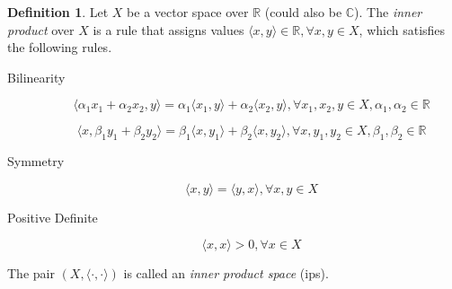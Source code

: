 \documentclass[11pt]{amsart}
\theoremstyle{definition}
\newtheorem{definition}[theorem]{Definition}
\numberwithin{equation}{section}
\newcommand{\bR}{ \mathbb{R} }	%
\newcommand{\bC}{ \mathbb{C} }	%
\begin{document}
\begin{definition}\label{def:11}
Let $X$ be a vector space over $\bR$ (could also be $\bC$). The \textit{inner product} over $X$ is a rule that assigns values $\langle x, y \rangle \in \bR, \forall x,y \in X$, which satisfies the following rules. 
\begin{description}
\item[Bilinearity]
\vspace{6pt}

\[\label{eq:Bi-Lin 1} \tag{Bi-Lin 1} \langle \alpha_1 x_1 + \alpha_2 x_2, y \rangle = \alpha_1 \langle x_1, y\rangle + \alpha_2 \langle x_2, y \rangle , \forall x_1, x_2, y \in X, \alpha_1, \alpha_2 \in \bR\]

\[\label{eq:Bi-Lin 2} \tag{Bi-Lin 2} \langle x,  \beta_1 y_1 + \beta_2 y_2 \rangle = \beta_1 \langle x, y_1 \rangle + \beta_2 \langle x, y_2 \rangle , \forall x, y_1, y_2 \in X, \beta_1, \beta_2 \in \bR \]

\vspace{6pt}

\item[Symmetry] \[\label{eq:Sym} \tag{Sym} \langle x,y \rangle = \langle y,x \rangle, \forall x,y \in X \]

\vspace{6pt}

\item[Positive Definite] \[ \label{eq:Pos Def} \tag{Pos Def} \langle x, x \rangle	> 0, \forall x \in X\]
\end{description}

\vspace{6pt}

The pair $\left( X, \langle \cdot, \cdot \rangle \right)$ is called an \textit{inner product space}  (ips).
\end{definition}

\vspace{6pt}
\end{document}
